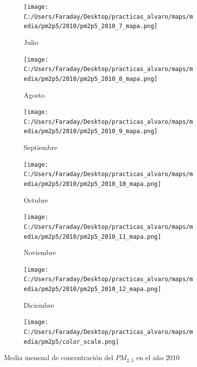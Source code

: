 \documentclass[12pt]{article}
\begin{document}
\begin{figure}[H]
\begin{subfigure}[H]{0.15\textwidth}
\texttt{[image: C:/Users/Faraday/Desktop/practicas\_alvaro/maps/media/pm2p5/2010/pm2p5\_2010\_7\_mapa.png]}
\captionsetup{labelformat=empty}
\caption{Julio}
\label{fig:map-pm2p5-2010-7}
\end{subfigure}
%
\begin{subfigure}[H]{0.15\textwidth}
\texttt{[image: C:/Users/Faraday/Desktop/practicas\_alvaro/maps/media/pm2p5/2010/pm2p5\_2010\_8\_mapa.png]}
\captionsetup{labelformat=empty}
\caption{Agosto}
\label{fig:map-pm2p5-2010-8}
\end{subfigure}
%
\begin{subfigure}[H]{0.15\textwidth}
\texttt{[image: C:/Users/Faraday/Desktop/practicas\_alvaro/maps/media/pm2p5/2010/pm2p5\_2010\_9\_mapa.png]}
\captionsetup{labelformat=empty}
\caption{Septiembre}
\label{fig:map-pm2p5-2010-9}
\end{subfigure}
%
\begin{subfigure}[H]{0.15\textwidth}
\texttt{[image: C:/Users/Faraday/Desktop/practicas\_alvaro/maps/media/pm2p5/2010/pm2p5\_2010\_10\_mapa.png]}
\captionsetup{labelformat=empty}
\caption{Octubre}
\label{fig:map-pm2p5-2010-10}
\end{subfigure}
%
\begin{subfigure}[H]{0.15\textwidth}
\texttt{[image: C:/Users/Faraday/Desktop/practicas\_alvaro/maps/media/pm2p5/2010/pm2p5\_2010\_11\_mapa.png]}
\captionsetup{labelformat=empty}
\caption{Noviembre}
\label{fig:map-pm2p5-2010-11}
\end{subfigure}
%
\begin{subfigure}[H]{0.15\textwidth}
\texttt{[image: C:/Users/Faraday/Desktop/practicas\_alvaro/maps/media/pm2p5/2010/pm2p5\_2010\_12\_mapa.png]}
\captionsetup{labelformat=empty}
\caption{Diciembre}
\label{fig:map-pm2p5-2010-12}
\end{subfigure}

\begin{subfigure}[H]{0.45\textwidth}
\texttt{[image: C:/Users/Faraday/Desktop/practicas\_alvaro/maps/media/pm2p5/color\_scale.png]}
\captionsetup{labelformat=empty}
\caption{}
\end{subfigure}

\vspace*{-7mm}
\caption{Media mensual de concentración del $PM_{2,5}$ en el año 2010}
\label{fig:map-pm2p5-2010}
\end{figure}
\end{document}
